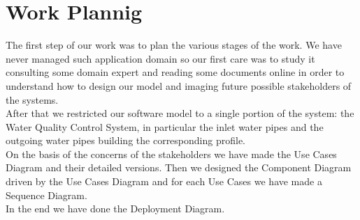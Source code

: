 \newpage\chapter{\textbf{Work Plannig}}
The first step of our work was to plan the various stages of the work. We have never managed such application domain so our first care was to study it consulting some domain expert and reading some documents online in order to understand how to design our model and imaging future possible stakeholders of the systems.
\\After that we restricted our software model to a single portion of the system: the Water Quality Control System, in particular the inlet water pipes and the outgoing water pipes building the corresponding profile.
\\On the basis of the concerns of the stakeholders we have made the Use Cases Diagram and their detailed versions. Then we designed the Component Diagram driven by the Use Cases Diagram and for each Use Cases we have made a Sequence Diagram.
\\In the end we have done the Deployment Diagram.
